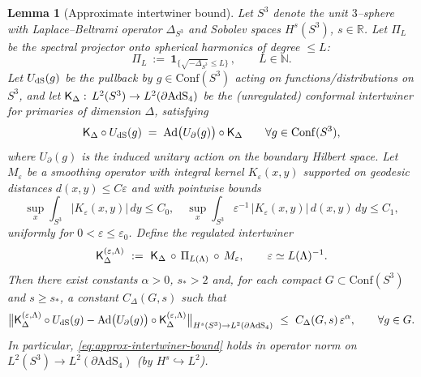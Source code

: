 \documentclass[10pt]{article}
\theoremstyle{definition}
\theoremstyle{plain}
\newtheorem{lemma}{Lemma}[section]
\begin{document}
\begin{lemma}[Approximate intertwiner bound]\label{lem:approx-intertwiner-new}
Let $S^3$ denote the unit $3$--sphere with Laplace--Beltrami operator $\Delta_{S^3}$ and Sobolev spaces $H^s(S^3)$, $s\in\mathbb R$.
Let $\Pi_{L}$ be the spectral projector onto spherical harmonics of degree $\le L$:
\[
\Pi_L \ :=\ \mathbf 1_{\{\sqrt{-\Delta_{S^3}}\le L\}}\,,\qquad L\in\mathbb N.
\]
Let $U_{\rm dS}(g)$ be the pullback by $g\in \mathrm{Conf}(S^3)$ acting on functions/distributions on $S^3$,
and let ${\sf K}_\Delta:\,L^2(S^3)\to L^2(\partial\mathrm{AdS}_4)$ be the (unregulated) conformal intertwiner for primaries of dimension $\Delta$, satisfying
\begin{equation}\label{eq:exact-intertwine}
{\sf K}_\Delta\circ U_{\rm dS}(g)\;=\;\mathrm{Ad}\big(U_\partial(g)\big)\circ{\sf K}_\Delta\qquad\forall g\in\mathrm{Conf}(S^3),
\end{equation}
where $U_\partial(g)$ is the induced unitary action on the boundary Hilbert space.
Let $M_\varepsilon$ be a smoothing operator with integral kernel $K_\varepsilon(x,y)$ supported on geodesic distances $d(x,y)\le C\varepsilon$ and with pointwise bounds
\begin{equation}\label{eq:kernel-bounds}
\sup_{x}\int_{S^3} |K_\varepsilon(x,y)|\,dy\le C_0,\quad
\sup_{x}\int_{S^3} \varepsilon^{-1}\,|K_\varepsilon(x,y)|\,d(x,y)\,dy\le C_1,
\end{equation}
uniformly for $0<\varepsilon\le \varepsilon_0$. Define the regulated intertwiner
\[
{\sf K}_\Delta^{(\varepsilon,\Lambda)}\ :=\ {\sf K}_\Delta\,\circ\,\Pi_{L(\Lambda)}\,\circ\,M_\varepsilon,\qquad \varepsilon\simeq L(\Lambda)^{-1}.
\]
Then there exist constants $\alpha>0$, $s_*\!>2$ and, for each compact $G\subset\mathrm{Conf}(S^3)$ and $s\ge s_*$, a constant $C_\Delta(G,s)$ such that
\begin{equation}\label{eq:approx-intertwiner-bound}
\big\|{\sf K}_\Delta^{(\varepsilon,\Lambda)} \circ U_{\rm dS}(g)
- \mathrm{Ad}\big(U_\partial(g)\big)\circ {\sf K}_\Delta^{(\varepsilon,\Lambda)}\big\|_{H^s(S^3)\to L^2(\partial\mathrm{AdS}_4)}
\ \le\ C_\Delta(G,s)\,\varepsilon^\alpha,\qquad \forall g\in G.
\end{equation}
In particular, \eqref{eq:approx-intertwiner-bound} holds in operator norm on $L^2(S^3)\to L^2(\partial\mathrm{AdS}_4)$ (by $H^s\hookrightarrow L^2$).
\end{lemma}
\end{document}
